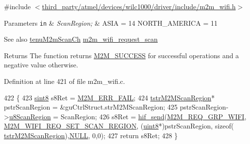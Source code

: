 {\ttfamily \#include $<$\hyperlink{m2m__wifi_8h}{third\+\_\+party/atmel/devices/wilc1000/driver/include/m2m\+\_\+wifi.\+h}$>$}


\begin{DoxyParams}[1]{Parameters}
\mbox{\tt in}  & {\em Scan\+Region;} & A\+S\+IA = 14 N\+O\+R\+T\+H\+\_\+\+A\+M\+E\+R\+I\+CA = 11 \\
\hline
\end{DoxyParams}
\begin{DoxySeeAlso}{See also}
\hyperlink{group__WlanEnums_ga2a91dd671e2672dba1a7ed45230f3a99}{tenu\+M2m\+Scan\+Ch} \hyperlink{group__WifiRequestScanFn_ga499dfa24a19c2e84776aeabedf897135}{m2m\+\_\+wifi\+\_\+request\+\_\+scan}
\end{DoxySeeAlso}
\begin{DoxyReturn}{Returns}
The function returns \hyperlink{nm__common_8h_a9ef27ba27aafdd1aa3a79d3ba2c36b8f}{M2\+M\+\_\+\+S\+U\+C\+C\+E\+SS} for successful operations and a negative value otherwise. 
\end{DoxyReturn}


Definition at line 421 of file m2m\+\_\+wifi.\+c.


\begin{DoxyCode}
422 \{
423     \hyperlink{group__DataT_gae35f10ffd0ac8dd2bc3e794da9bdfbc7}{sint8}  s8Ret = \hyperlink{nm__common_8h_a39ed05df730834f2255971ca9879996e}{M2M\_ERR\_FAIL};
424     \hyperlink{structtstrM2MScanRegion}{tstrM2MScanRegion}* pstrScanRegion = &guCtrlStruct.strM2MScanRegion;
425     pstrScanRegion->\hyperlink{structtstrM2MScanRegion_a0fa84955213be6c6bf2602b743ec315f}{u8ScanRegion} = ScanRegion;
426     s8Ret = \hyperlink{m2m__hif_8c_a13ba8ad11b2ac39516ca787386d16ce0}{hif\_send}(\hyperlink{nm__common_8h_a9ab02eb1aea02a75c3f5aade4eef1276aeb9a7d57324ba4b8a6c2a5f46dd499c2}{M2M\_REQ\_GRP\_WIFI}, 
      \hyperlink{group__WlanEnums_gga064de09dec1d5e88ed8d075fa40f57deab10eb46bba8f7314383ad0e642faa4ce}{M2M\_WIFI\_REQ\_SET\_SCAN\_REGION}, (\hyperlink{group__DataT_ga4df709a77647e870bbf1d955b8edc9a6}{uint8}*)pstrScanRegion, \textcolor{keyword}{sizeof}(
      \hyperlink{structtstrM2MScanRegion}{tstrM2MScanRegion}),\hyperlink{group__BSPDefine_ga070d2ce7b6bb7e5c05602aa8c308d0c4}{NULL}, 0,0);
427     \textcolor{keywordflow}{return} s8Ret;
428 \}
\end{DoxyCode}
